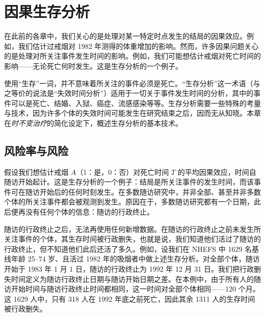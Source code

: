 \chapter{因果生存分析}

\newcommand{\survaxes}{%
  \draw (0,0) rectangle (9,5);
  \foreach \m in {0,12,...,120}{%
    \draw (\m*0.075,0) -- (\m*0.075,-0.10);
    \node[below,font=\scriptsize,inner sep=1.5pt] at (\m*0.075,-0.10) {\m};}
  \foreach \p in {0.5,0.6,0.7,0.8,0.9,1.0}{%
    \draw (0,{(\p-0.5)*10}) -- (-0.10,{(\p-0.5)*10});
    \node[left,font=\scriptsize,inner sep=1.5pt] at (-0.12,{(\p-0.5)*10}) {\p};}
  \node[below=16pt,font=\small] at (4.5,-0.10) {随访月数};
  \node[rotate=90,above=20pt,font=\small] at (-0.78,2.5) {生存概率};}

在此前的各章中，我们关心的是处理对某一特定时点发生的结局的因果效应。例如，我们估计过戒烟对 1982 年测得的体重增加的影响。然而，许多因果问题关心的是处理对所关注事件发生时间的影响。例如，我们可能想估计戒烟对死亡时间的影响——无论死亡何时发生。这是生存分析的一个例子。

使用“生存”一词，并不意味着所关注的事件必须是死亡。“生存分析”这一术语（与之等价的说法是“失效时间分析”）适用于一切关于事件发生时间的分析，其中的事件可以是死亡、结婚、入狱、癌症、流感感染等等。生存分析需要一些特殊的考量与技术，因为许多个体的失效时间可能发生在研究结束之后，因而无从知晓。本章在\emph{时不变治疗}的简化设定下，概述生存分析的基本技术。

\section{风险率与风险}

假设我们想估计戒烟 $A$（1：是，0：否）对死亡时间 $T$ 的平均因果效应，时间自随访开始起计。这是生存分析的一个例子：结局是所关注事件的发生时间，而该事件可在随访开始后的任何时刻发生。在多数随访研究中，并非全部、甚至并非多数个体的所关注事件都会被观测到发生。原因在于，多数随访研究都有一个日期，此后便再没有任何个体的信息：随访的行政终止。

随访的行政终止之后，无法再使用任何新增数据。在随访的行政终止之前未发生所关注事件的个体，其生存时间被行政删失，也就是说，我们知道他们活过了随访的行政终止，但不知道他们此后还活了多久。例如，设我们在 NHEFS 中 1629 名基线年龄 25–74 岁、且活过 1982 年的吸烟者中做上述生存分析。对全部个体，随访开始于 1983 年 1 月 1 日，随访的行政终止为 1992 年 12 月 31 日。我们把行政删失时间定义为随访行政终止日期与随访开始日期之差。在本例中，由于所有人的随访开始时间与随访行政终止时间都相同，这一时间对全部个体相同——120 个月。这 1629 人中，只有 318 人在 1992 年底之前死亡，因此其余 1311 人的生存时间被行政删失。

